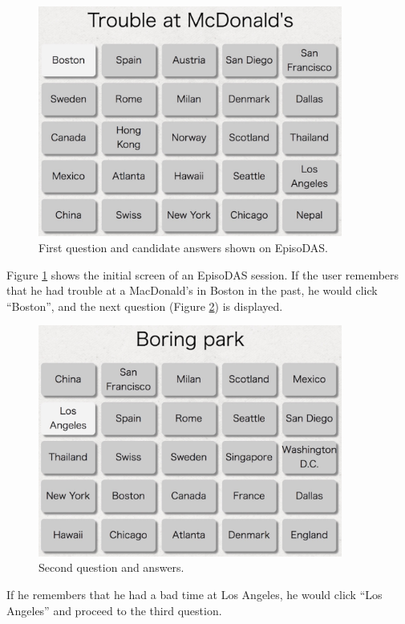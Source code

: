 \documentclass[sigconf]{acmart}
\begin{document}
\begin{figure}[t]
  \includegraphics[width=10cm,bb=-60 0 1338 1060]{figures/EpisoDAS1.jpg}
  \caption{First question and candidate answers shown on EpisoDAS.}
  \label{EpisoDAS1}
\end{figure}

Figure \ref{EpisoDAS1} shows
the initial screen of an EpisoDAS session.
%
If the user remembers that he had trouble at a MacDonald's in Boston in the past,
he would click ``Boston'', and the next question (Figure \ref{EpisoDAS2}) is displayed.

\begin{figure}[t]
  \includegraphics[width=10cm,bb=-60 0 1336 1062]{figures/EpisoDAS2.jpg}
  \caption{Second question and answers.}
  \label{EpisoDAS2}
\end{figure}

If he remembers that he had a bad time at Los Angeles,
he would click ``Los Angeles'' and proceed to the third question.
\end{document}
